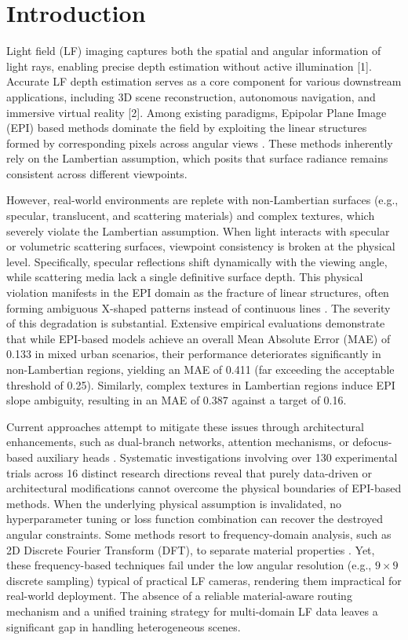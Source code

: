 \section{Introduction}

Light field (LF) imaging captures both the spatial and angular information of light rays, enabling precise depth estimation without active illumination [1]. Accurate LF depth estimation serves as a core component for various downstream applications, including 3D scene reconstruction, autonomous navigation, and immersive virtual reality [2]. Among existing paradigms, Epipolar Plane Image (EPI) based methods dominate the field by exploiting the linear structures formed by corresponding pixels across angular views . These methods inherently rely on the Lambertian assumption, which posits that surface radiance remains consistent across different viewpoints.

However, real-world environments are replete with non-Lambertian surfaces (e.g., specular, translucent, and scattering materials) and complex textures, which severely violate the Lambertian assumption. When light interacts with specular or volumetric scattering surfaces, viewpoint consistency is broken at the physical level. Specifically, specular reflections shift dynamically with the viewing angle, while scattering media lack a single definitive surface depth. This physical violation manifests in the EPI domain as the fracture of linear structures, often forming ambiguous X-shaped patterns instead of continuous lines . The severity of this degradation is substantial. Extensive empirical evaluations demonstrate that while EPI-based models achieve an overall Mean Absolute Error (MAE) of 0.133 in mixed urban scenarios, their performance deteriorates significantly in non-Lambertian regions, yielding an MAE of 0.411 (far exceeding the acceptable threshold of 0.25). Similarly, complex textures in Lambertian regions induce EPI slope ambiguity, resulting in an MAE of 0.387 against a target of 0.16.

Current approaches attempt to mitigate these issues through architectural enhancements, such as dual-branch networks, attention mechanisms, or defocus-based auxiliary heads . Systematic investigations involving over 130 experimental trials across 16 distinct research directions reveal that purely data-driven or architectural modifications cannot overcome the physical boundaries of EPI-based methods. When the underlying physical assumption is invalidated, no hyperparameter tuning or loss function combination can recover the destroyed angular constraints. Some methods resort to frequency-domain analysis, such as 2D Discrete Fourier Transform (DFT), to separate material properties . Yet, these frequency-based techniques fail under the low angular resolution (e.g., $9 \times 9$ discrete sampling) typical of practical LF cameras, rendering them impractical for real-world deployment. The absence of a reliable material-aware routing mechanism and a unified training strategy for multi-domain LF data leaves a significant gap in handling heterogeneous scenes.

